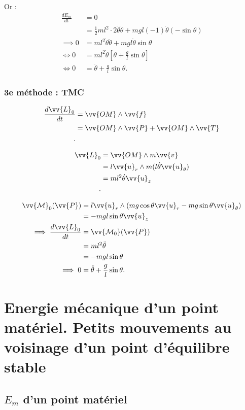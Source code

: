 Or :
\begin{align*}
    \frac{dE_m}{dt} &= 0 \\
    &= \frac{1}{2} ml^2\cdot 2\dot{\theta}\ddot{\theta}+mgl(-1)\dot{\theta}(-\sin\theta)\\
    \implies 0 &= ml^2\dot{\theta}\ddot{\theta} + mgl\dot{\theta}\sin\theta \\
    \iff 0&= ml^2\dot{\theta} \left[\ddot{\theta} +\frac{g}{l}\sin \theta \right]\\
    \iff 0&= \ddot{\theta} +\frac{g}{l}\sin\theta 
.\end{align*}

\subsubsection{3e méthode : TMC}

\begin{align*}
    \frac{d\vv{L}_0}{dt} &= \vv{OM}\wedge \vv{f} \\
    &= \vv{OM} \wedge \vv{P} + \vv{OM}\wedge \vv{T} \\
.\end{align*}

\begin{align*}
    \vv{L}_0 &= \vv{OM} \wedge m\vv{v} \\
    &= l\vv{u}_r \wedge m(l\dot{\theta}\vv{u}_\theta) \\
    &= ml^2\dot{\theta}\vv{u}_z \\
.\end{align*}

\begin{align*}
    \vv{\mathcal{M}}_0(\vv{P}) &= l\vv{u}_r\wedge (mg\cos\theta \vv{u}_r -mg\sin\theta \vv{u}_\theta) \\
    &= -mgl\sin\theta \vv{u}_z\\
    \implies \frac{d\vv{L}_0}{dt} &= \vv{\mathcal{M}_0}(\vv{P}) \\
    &= ml^2\ddot{\theta} \\
    &= -mgl\sin \theta \\
    \implies 0&= \ddot{\theta} + \frac{g}{l}\sin\theta
.\end{align*}
\newpage

\section{Energie mécanique d'un point matériel. Petits mouvements au voisinage d'un point d'équilibre stable}
\subsection{\(E_{m}\) d'un point matériel}
